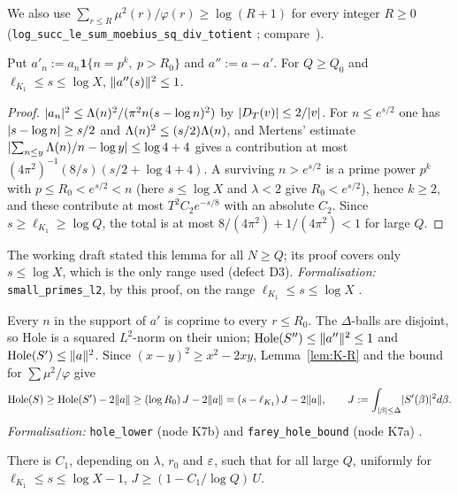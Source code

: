 We also use $\sum_{r\le R}\mu^2(r)/\varphi(r)\ge\log(R+1)$ for every integer $R\ge0$ (\texttt{log\_succ\_le\_sum\_moebius\_sq\_div\_totient}
\tagL; compare~\cite[(3.18)]{MV}).

\begin{lemma}\label{lem:K-S}
Put $a'_n:=a_n\mathbf 1\{n=p^k,\ p>R_0\}$ and $a'':=a-a'$. For $Q\ge Q_0$ and $\ell_{K_1}\le s\le\log X$, $\lVert a''(s)\rVert^2\le1$.
\end{lemma}
\begin{proof}
$\lvert a_n\rvert^2\le\Lambda(n)^2/(\pi^2n(s-\log n)^2)$ by $\lvert D_T(v)\rvert\le2/\lvert v\rvert$. For $n\le e^{s/2}$ one has $\lvert s-\log n\rvert\ge s/2$ and
$\Lambda(n)^2\le(s/2)\Lambda(n)$, and Mertens' estimate $\lvert \sum_{n\le y}\Lambda(n)/n-\log y\rvert\le\log4+4$ gives a contribution at most
$(4\pi^2)^{-1}(8/s)(s/2+\log4+4)$. A surviving $n>e^{s/2}$ is a prime power $p^k$ with $p\le R_0<e^{s/2}<n$ (here $s\le\log X$ and
$\lambda<2$ give $R_0<e^{s/2}$), hence $k\ge2$, and these contribute at most $T^2C_2e^{-s/8}$ with an absolute $C_2$. Since
$s\ge\ell_{K_1}\ge\log Q$, the total is at most $8/(4\pi^2)+1/(4\pi^2)<1$ for large $Q$.
\end{proof}
The working draft stated this lemma for all $N\ge Q$; its proof covers only $s\le\log X$, which is the only range used (defect D3).
\emph{Formalisation:} \texttt{small\_primes\_l2}, by this proof, on the range $\ell_{K_1}\le s\le\log X$ \tagL.

Every $n$ in the support of $a'$ is coprime to every $r\le R_0$. The $\Delta$-balls are disjoint, so $\mathrm{Hole}$ is a squared
$L^2$-norm on their union; $\mathrm{Hole}(S'')\le\lVert a''\rVert^2\le1$ and $\mathrm{Hole}(S')\le\lVert a\rVert^2$. Since $(x-y)^2\ge x^2-2xy$,
Lemma~\ref{lem:K-R} and the bound for $\sum\mu^2/\varphi$ give
\begin{equation}\label{eq:K-hole}
\mathrm{Hole}(S)\ge\mathrm{Hole}(S')-2\lVert a\rVert\ge(\log R_0)\,J-2\lVert a\rVert=(s-\ell_{K_1})\,J-2\lVert a\rVert,\qquad J:=\int_{\lvert \beta\rvert\le\Delta}\lvert S'(\beta)\rvert^2d\beta .
\end{equation}
\emph{Formalisation:} \texttt{hole\_lower} (node K7b) and \texttt{farey\_hole\_bound} (node K7a) \tagL.

\begin{lemma}\label{lem:K-P}
There is $C_1$, depending on $\lambda$, $r_0$ and $\varepsilon$, such that for all large $Q$, uniformly for $\ell_{K_1}\le s\le\log X-1$, $J\ge(1-C_1/\log Q)\,U$.
\end{lemma}

